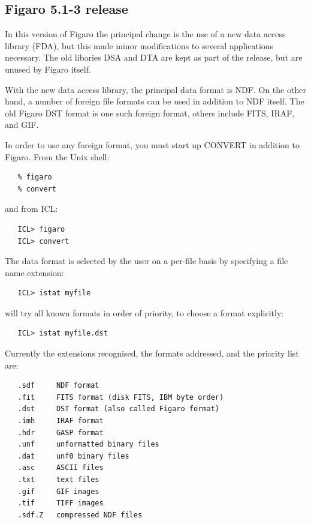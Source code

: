 \documentclass[11pt,twoside]{article}
\begin{document}

\subsection{\label{news513}Figaro 5.1-3 release}

   In this version of Figaro the principal change is the use of a new data
   access library (FDA), but this made minor modifications to several
   applications necessary.  The old libaries DSA and DTA are kept as
   part of the release, but are unused by Figaro itself.

   With the new data access library, the principal data format is NDF.  On
   the other hand, a number of foreign file formats can be used in addition
   to NDF itself.  The old Figaro DST format is one such foreign format,
   others include FITS, IRAF, and GIF.

   In order to use any foreign format, you must start up CONVERT in addition
   to Figaro.  From the Unix shell:

\begin{verbatim}
   % figaro
   % convert
\end{verbatim}

   and from ICL:

\begin{verbatim}
   ICL> figaro
   ICL> convert
\end{verbatim}

   The data format is selected by the user on a per-file basis by specifying
   a file name extension:

\begin{verbatim}
   ICL> istat myfile
\end{verbatim}

   will try all known formats in order of priority, to choose a format
   explicitly:

\begin{verbatim}
   ICL> istat myfile.dst
\end{verbatim}

   Currently the extensions recognised, the formats addressed, and the
   priority list are:

\begin{verbatim}
   .sdf     NDF format
   .fit     FITS format (disk FITS, IBM byte order)
   .dst     DST format (also called Figaro format)
   .imh     IRAF format
   .hdr     GASP format
   .unf     unformatted binary files
   .dat     unf0 binary files
   .asc     ASCII files
   .txt     text files
   .gif     GIF images
   .tif     TIFF images
   .sdf.Z   compressed NDF files
\end{verbatim}
\end{document}
